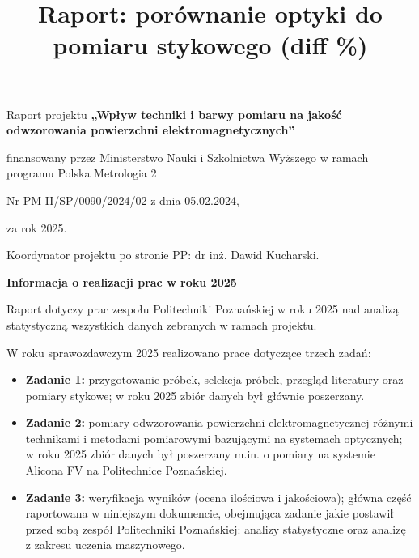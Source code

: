 \documentclass[
  10pt,
]{article}
\title{Raport: porównanie optyki do pomiaru stykowego
(\textbar diff\textbar{} \%)}
\author{}
\date{\vspace{-2.5em}}
\newcommand{\PMIITitleLine}{Raport projektu \textbf{„Wpływ techniki i barwy pomiaru na jakość odwzorowania powierzchni elektromagnetycznych”}}
\newcommand{\PMIIFundingLineA}{finansowany przez Ministerstwo Nauki i Szkolnictwa Wyższego w ramach programu Polska Metrologia 2}
\newcommand{\PMIIFundingLineB}{Nr PM-II/SP/0090/2024/02 z dnia 05.02.2024,}
\renewcommand{\maketitle}{}
\begin{document}
\maketitle

\begin{titlepage}
\centering
{\Large \PMIITitleLine\par}
\vspace{6mm}
{\normalsize \PMIIFundingLineA\par}
\vspace{2mm}
{\normalsize \PMIIFundingLineB\par}
\vspace{2mm}
{\normalsize za rok 2025.\par}
\vspace{10mm}
{\normalsize Koordynator projektu po stronie PP: dr inż. Dawid Kucharski.\par}
\end{titlepage}

    \thispagestyle{plain}
\noindent\textbf{Informacja o realizacji prac w roku 2025}\par
\vspace{4mm}
\noindent\fontsize{10}{12}\selectfont
Raport dotyczy prac zespołu Politechniki Poznańskiej w roku 2025 nad analizą statystyczną wszystkich danych zebranych w ramach projektu.\par
W roku sprawozdawczym 2025 realizowano prace dotyczące trzech zadań:\par
\vspace{2mm}
\begin{itemize}
  \item \textbf{Zadanie 1:} przygotowanie próbek, selekcja próbek, przegląd literatury oraz pomiary stykowe; w roku 2025 zbiór danych był głównie poszerzany.
  \item \textbf{Zadanie 2:} pomiary odwzorowania powierzchni elektromagnetycznej różnymi technikami i metodami pomiarowymi bazującymi na systemach optycznych; w roku 2025 zbiór danych był poszerzany m.in. o pomiary na systemie Alicona FV na Politechnice Poznańskiej.
  \item \textbf{Zadanie 3:} weryfikacja wyników (ocena ilościowa i jakościowa); główna część raportowana w niniejszym dokumencie, obejmująca zadanie jakie postawił przed sobą zespół Politechniki Poznańskiej: analizy statystyczne oraz analizę z zakresu uczenia maszynowego.
\end{itemize}
\end{document}
